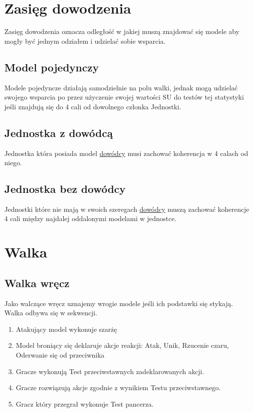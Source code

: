 \section{Zasięg dowodzenia}
Zasięg dowodzenia oznacza odległość w jakiej muszą znajdować się modele aby mogły być jednym odziałem i udzielać sobie wsparcia.
\subsection{Model pojedynczy}
Modele pojedyncze działają samodzielnie na polu walki, jednak mogą udzielać swojego wsparcia po przez użyczenie swojej wartości SU do testów tej statystyki jeśli znajdują się do 4 cali od dowolnego członka Jednostki.

\subsection{Jednostka z dowódcą}
Jednostka która posiada model \hyperref[sec:link_uw_dowdoca]{dowódcy} musi zachować koherencja w 4 calach od niego.  

\subsection{Jednostka bez dowódcy}
Jednostki które nie mają w swoich szeregach \hyperref[sec:link_uw_dowdoca]{dowódcy} muszą zachować koherencje 4 cali między najdalej oddalonymi modelami w jednostce. 

\section{Walka}
\subsection{Walka wręcz}
Jako walczące wręcz uznajemy wrogie modele jeśli ich podstawki się stykają. Walka odbywa się w sekwencji.
\begin{enumerate}
    \item Atakujący model wykonuje szarżę
    \item Model broniący się deklaruje akcje reakcji: Atak, Unik, Rzucenie czaru, Oderwanie się od przeciwnika
    \item Gracze wykonują Test przeciwstawnych zadeklarowanych akcji.
    \item Gracze rozwiązują akcje zgodnie z wynikiem Testu przeciwstawnego.
    \item Gracz który przegrał wykonuje Test pancerza.
\end{enumerate}

